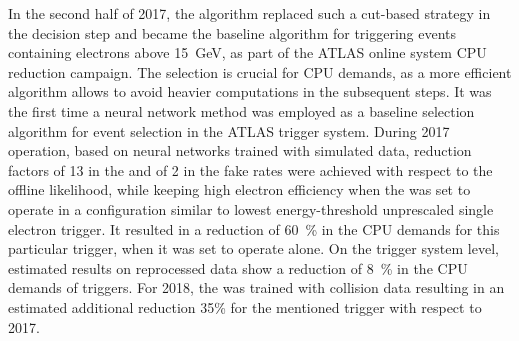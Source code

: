 In the second half of 2017, the \rnn{} algorithm replaced such a cut-based strategy
in the \fastcalo{} decision step and became the baseline algorithm
for triggering events containing electrons above \SI{15}{\GeV}, as part of the ATLAS online system CPU reduction campaign. The \fastcalo{} selection is crucial for CPU demands, as a more
efficient algorithm allows to avoid heavier computations in the
subsequent steps.  It was the first time a neural network method was employed as
a baseline selection algorithm for event selection in the ATLAS trigger system.
During 2017 operation, based on neural networks trained with simulated data,
reduction factors of 13 in the \fastcalo{} and of 2 in
the \hlt{} fake rates were achieved with respect to the offline likelihood, while
keeping high electron efficiency when the \rnn{} was set to operate in a
configuration similar to lowest energy-threshold unprescaled single electron
trigger. It resulted in a reduction of \SI{60}{\%} in the CPU demands for this particular trigger, when it was set to operate alone. On the trigger system level,
estimated results on reprocessed data show a reduction of \SI{8}{\%} in the CPU
demands of \egamma{} triggers. For 2018, the \rnn{} was trained with collision
data resulting in an estimated additional reduction 35\% for the
mentioned trigger with respect to 2017. 
